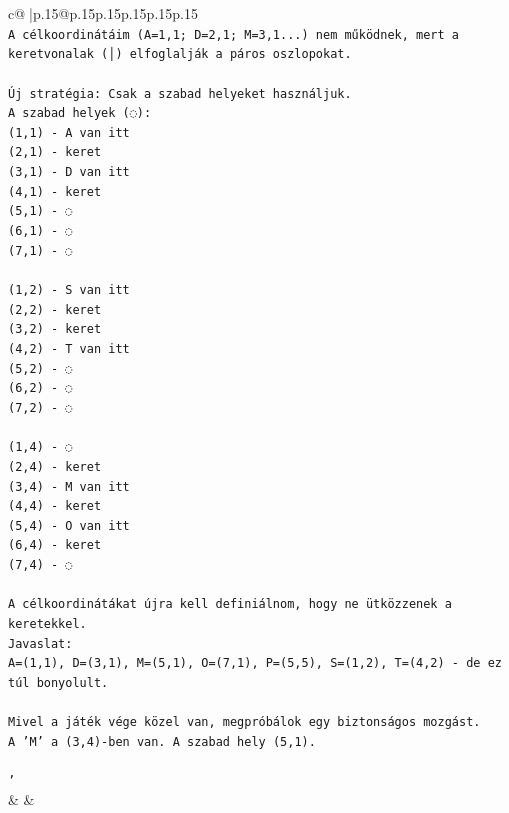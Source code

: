 \documentclass{article}
\begin{document}
{\begin{supertabular}{c@{$\;$}|p{.15\linewidth}@{}p{.15\linewidth}p{.15\linewidth}p{.15\linewidth}p{.15\linewidth}p{.15\linewidth}}
{{{\\ 
\texttt{A célkoordinátáim (A=1,1; D=2,1; M=3,1...) nem működnek, mert a keretvonalak (│) elfoglalják a páros oszlopokat.} \\
\\ 
\texttt{Új stratégia: Csak a szabad helyeket használjuk.} \\
\texttt{A szabad helyek (◌):} \\
\texttt{(1,1) {-} A van itt} \\
\texttt{(2,1) {-} keret} \\
\texttt{(3,1) {-} D van itt} \\
\texttt{(4,1) {-} keret} \\
\texttt{(5,1) {-} ◌} \\
\texttt{(6,1) {-} ◌} \\
\texttt{(7,1) {-} ◌} \\
\\ 
\texttt{(1,2) {-} S van itt} \\
\texttt{(2,2) {-} keret} \\
\texttt{(3,2) {-} keret} \\
\texttt{(4,2) {-} T van itt} \\
\texttt{(5,2) {-} ◌} \\
\texttt{(6,2) {-} ◌} \\
\texttt{(7,2) {-} ◌} \\
\\ 
\texttt{(1,4) {-} ◌} \\
\texttt{(2,4) {-} keret} \\
\texttt{(3,4) {-} M van itt} \\
\texttt{(4,4) {-} keret} \\
\texttt{(5,4) {-} O van itt} \\
\texttt{(6,4) {-} keret} \\
\texttt{(7,4) {-} ◌} \\
\\ 
\texttt{A célkoordinátákat újra kell definiálnom, hogy ne ütközzenek a keretekkel.} \\
\texttt{Javaslat:} \\
\texttt{A=(1,1), D=(3,1), M=(5,1), O=(7,1), P=(5,5), S=(1,2), T=(4,2) {-} de ez túl bonyolult.} \\
\\ 
\texttt{Mivel a játék vége közel van, megpróbálok egy biztonságos mozgást.} \\
\texttt{A 'M' a (3,4){-}ben van. A szabad hely (5,1).} \\
\\ 
\texttt{'} \\
            }
        }
    }
    & & \\ \\


\end{supertabular}}
\end{document}
